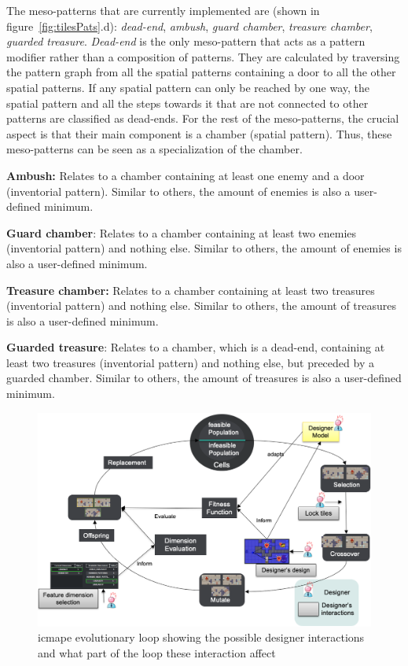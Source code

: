 The meso-patterns that are currently implemented are (shown in figure~\ref{fig:tilesPats}.d): \emph{dead-end}, \emph{ambush}, \emph{guard chamber}, \emph{treasure chamber}, \emph{guarded treasure}. \emph{Dead-end} is the only meso-pattern that acts as a pattern modifier rather than a composition of patterns. They are calculated by traversing the pattern graph from all the spatial patterns containing a door to all the other spatial patterns. If any spatial pattern can only be reached by one way, the spatial pattern and all the steps towards it that are not connected to other patterns are classified as dead-ends. For the rest of the meso-patterns, the crucial aspect is that their main component is a chamber (spatial pattern). Thus, these meso-patterns can be seen as a specialization of the chamber. 

\textbf{Ambush:} Relates to a chamber containing at least one enemy and a door (inventorial pattern). Similar to others, the amount of enemies is also a user-defined minimum. 

\textbf{Guard chamber}: Relates to a chamber containing at least two enemies (inventorial pattern) and nothing else. Similar to others, the amount of enemies is also a user-defined minimum. 

\textbf{Treasure chamber:} Relates to a chamber containing at least two treasures (inventorial pattern) and nothing else. Similar to others, the amount of treasures is also a user-defined minimum. 

\textbf{Guarded treasure}: Relates to a chamber, which is a dead-end, containing at least two treasures (inventorial pattern) and nothing else, but preceded by a guarded chamber. Similar to others, the amount of treasures is also a user-defined minimum. 

\begin{figure}[!h]
\centerline{\includegraphics[width=\textwidth]{figures/EDD-figs/all-designers-interactions.png}}
\caption{\acrshort{icmape} evolutionary loop showing the possible designer interactions and what part of the loop these interaction affect} \label{fig:interactiveMAPE}
\end{figure}



